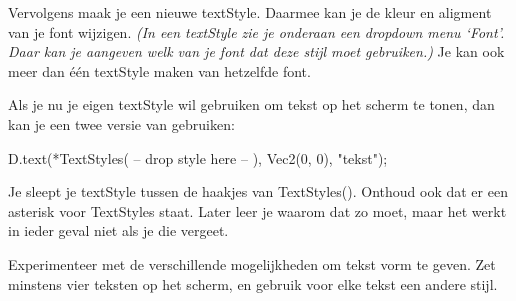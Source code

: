 Vervolgens maak je een nieuwe textStyle. Daarmee kan je de kleur en aligment van je font wijzigen. \textsl{(In een textStyle zie je onderaan een dropdown menu `Font'. Daar kan je aangeven welk van je font dat deze stijl moet gebruiken.)} Je kan ook meer dan \'e\'en textStyle maken van hetzelfde font.

Als je nu je eigen textStyle wil gebruiken om tekst op het scherm te tonen, dan kan je een twee versie van  gebruiken:

\begin{code}
D.text(*TextStyles( -- drop style here -- ), Vec2(0, 0), "tekst");
\end{code}

Je sleept je textStyle tussen de haakjes van TextStyles(). Onthoud ook dat er een asterisk voor TextStyles staat. Later leer je waarom dat zo moet, maar het werkt in ieder geval niet als je die vergeet.

\begin{exercise}
Experimenteer met de verschillende mogelijkheden om tekst vorm te geven. Zet minstens vier teksten op het scherm, en gebruik voor elke tekst een andere stijl.
\end{exercise}